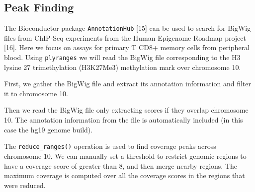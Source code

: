 \documentclass[10pt,letterpaper]{article}
\newenvironment{Shaded}{\begin{snugshade}}{\end{snugshade}}
\newcommand{\DataTypeTok}[1]{\textcolor[rgb]{0.13,0.29,0.53}{#1}}
\newcommand{\KeywordTok}[1]{\textcolor[rgb]{0.13,0.29,0.53}{\textbf{#1}}}
\newcommand{\NormalTok}[1]{#1}
\newcommand{\OperatorTok}[1]{\textcolor[rgb]{0.81,0.36,0.00}{\textbf{#1}}}
\newcommand{\StringTok}[1]{\textcolor[rgb]{0.31,0.60,0.02}{#1}}
\begin{document}
\hypertarget{peak-finding}{%
\subsection{Peak Finding}\label{peak-finding}}

The Bioconductor package \texttt{AnnotationHub} {[}15{]} can be used to
search for BigWig files from ChIP-Seq experiments from the Human
Epigenome Roadmap project {[}16{]}. Here we focus on assays for primary
T CD8+ memory cells from peripheral blood. Using \texttt{plyranges} we
will read the BigWig file corresponding to the H3 lysine 27
trimethylation (H3K27Me3) methylation mark over chromosome 10.

First, we gather the BigWig file and extract its annotation information
and filter it to chromosome 10.

\begin{Shaded}
\end{Shaded}

Then we read the BigWig file only extracting scores if they overlap
chromosome 10. The annotation information from the file is automatically
included (in this case the hg19 genome build).

\begin{Shaded}
\end{Shaded}

The \texttt{reduce\_ranges()} operation is used to find coverage peaks
across chromosome 10. We can manually set a threshold to restrict
genomic regions to have a coverage score of greater than 8, and then
merge nearby regions. The maximum coverage is computed over all the
coverage scores in the regions that were reduced.
\end{document}
